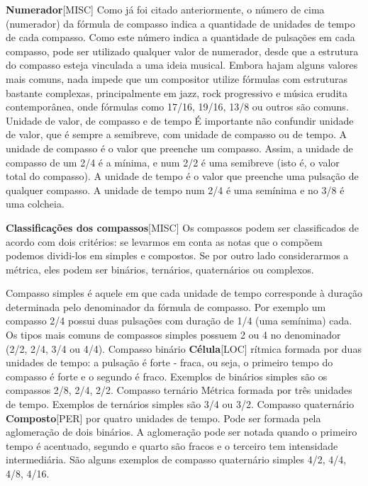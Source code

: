 \documentclass[a4paper,12pt]{article}
\begin{document}
\textbf{Numerador}\textsc{[MISC]} Como já foi citado anteriormente, o número de cima (numerador) da fórmula de compasso indica a quantidade de unidades de tempo de cada compasso. Como este número indica a quantidade de pulsações em cada compasso, pode ser utilizado qualquer valor de numerador, desde que a estrutura do compasso esteja vinculada a uma ideia musical. Embora hajam alguns valores mais comuns, nada impede que um compositor utilize fórmulas com estruturas bastante complexas, principalmente em jazz, rock progressivo e música erudita contemporânea, onde fórmulas como 17/16, 19/16, 13/8 ou outros são comuns. Unidade de valor, de compasso e de tempo É importante não confundir unidade de valor, que é sempre a semibreve, com unidade de compasso ou de tempo. A unidade de compasso é o valor que preenche um compasso. Assim, a unidade de compasso de um 2/4 é a mínima, e num 2/2 é uma semibreve (isto é, o valor total do compasso). A unidade de tempo é o valor que preenche uma pulsação de qualquer compasso. A unidade de tempo num 2/4 é uma semínima e no 3/8 é uma colcheia.

\textbf{Classificações dos compassos}\textsc{[MISC]} Os compassos podem ser classificados de acordo com dois critérios: se levarmos em conta as notas que o compõem podemos dividi-los em simples e compostos. Se por outro lado considerarmos a métrica, eles podem ser binários, ternários, quaternários ou complexos.

Compasso simples é aquele em que cada unidade de tempo corresponde à duração determinada pelo denominador da fórmula de compasso. Por exemplo um compasso 2/4 possui duas pulsações com duração de 1/4 (uma semínima) cada. Os tipos mais comuns de compassos simples possuem 2 ou 4 no denominador (2/2, 2/4, 3/4 ou 4/4). Compasso binário \textbf{Célula}\textsc{[LOC]} rítmica formada por duas unidades de tempo: a pulsação é forte - fraca, ou seja, o primeiro tempo do compasso é forte e o segundo é fraco. Exemplos de binários simples são os compassos 2/8, 2/4, 2/2. Compasso ternário Métrica formada por três unidades de tempo. Exemplos de ternários simples são 3/4 ou 3/2. Compasso quaternário \textbf{Composto}\textsc{[PER]} por quatro unidades de tempo. Pode ser formada pela aglomeração de dois binários. A aglomeração pode ser notada quando o primeiro tempo é acentuado, segundo e quarto são fracos e o terceiro tem intensidade intermediária. São alguns exemplos de compasso quaternário simples 4/2, 4/4, 4/8, 4/16.
\end{document}
